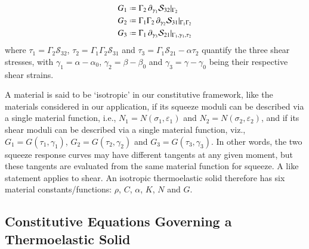 \begin{subequations}
\begin{align}
    G_1 & \defeq \Gamma_2 \, \partial_{\gamma_1} \mathcal{S}_{32} |_{\Gamma_2} \\ 
    G_2 & \defeq \Gamma_1 \Gamma_2 \, \partial_{\gamma_2} \mathcal{S}_{31} |_{\Gamma_1 \Gamma_2} 
    \label{shearCompliance3D} \\
    G_3 & \defeq \Gamma_1 \, \partial_{\gamma_3} \mathcal{S}_{21} |_{\Gamma_1 , \gamma_1 , \tau_2} 
    \end{align}
\end{subequations}
where $\tau_1 = \Gamma_2 \mathcal{S}_{32}$, $\tau_2 = \Gamma_1 \Gamma_2 \mathcal{S}_{31}$ and $\tau_3 = \Gamma_1 \mathcal{S}_{21} - \alpha \tau_2$ quantify the three shear stresses, with $\gamma_1 = \alpha - \alpha_0$, $\gamma_2 = \beta - \beta_0$ and $\gamma_3 = \gamma - \gamma_0$ being their respective shear strains.

A material is said to be `isotropic' in our constitutive framework, like the materials considered in our application, if its squeeze moduli can be described via a single material function, i.e., $N_1 = N (\sigma_1 , \varepsilon_1 )$ and $N_2 = N ( \sigma_2 , \varepsilon_2 )$, and if its shear moduli can be described via a single material function, viz., $G_1 = G ( \tau_1 , \gamma_1 )$, $G_2 = G ( \tau_2 , \gamma_2 )$ and $G_3 = G ( \tau_3 , \gamma_3 )$.  In other words, the two squeeze response curves may have different tangents at any given moment, but these tangents are evaluated from the same material function for squeeze.  A like statement applies to shear.  An isotropic thermo\-elastic solid therefore has six material constants\slash functions: $\rho$, $C$, $\alpha$, $K$, $N$ and $G$.

\subsection{Constitutive Equations Governing a Thermoelastic Solid}

